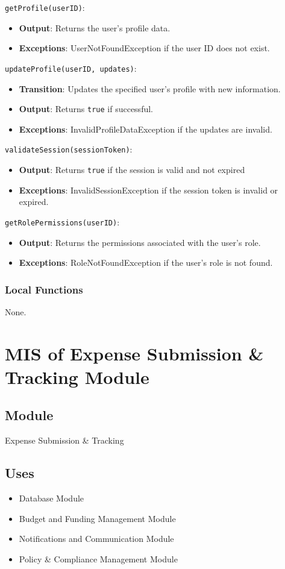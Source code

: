 \documentclass[12pt, titlepage]{article}
\begin{document}
\noindent \texttt{getProfile(userID)}:
\begin{itemize}
    \item \textbf{Output}: Returns the user's profile data.
    \item \textbf{Exceptions}: UserNotFoundException if the user ID does not exist.
\end{itemize}

\noindent \texttt{updateProfile(userID, updates)}:
\begin{itemize}
    \item \textbf{Transition}: Updates the specified user's profile with new information.
    \item \textbf{Output}: Returns \texttt{true} if successful.
    \item \textbf{Exceptions}: InvalidProfileDataException if the updates are invalid.
\end{itemize}

\noindent \texttt{validateSession(sessionToken)}:
\begin{itemize}
    \item \textbf{Output}: Returns \texttt{true} if the session is valid and not expired
    \item \textbf{Exceptions}: InvalidSessionException if the session token is invalid or expired.
\end{itemize}

\noindent \texttt{getRolePermissions(userID)}:
\begin{itemize}
    \item \textbf{Output}: Returns the permissions associated with the user's role.
    \item \textbf{Exceptions}: RoleNotFoundException if the user's role is not found.
\end{itemize}

\subsubsection{Local Functions}
None.

\section{MIS of Expense Submission & Tracking Module}
\subsection{Module}
Expense Submission & Tracking

\subsection{Uses}
\begin{itemize}
    \item Database Module
    \item Budget and Funding Management Module
    \item Notifications and Communication Module
    \item Policy \& Compliance Management Module
\end{itemize}
\end{document}
